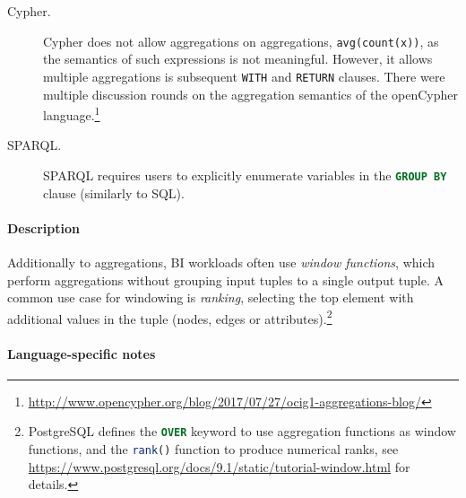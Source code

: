 \begin{description}
\item[Cypher.] Cypher does not allow aggregations on aggregations, \eg \lstinline[language=cypher]{avg(count(x))}, as the semantics of such expressions is not meaningful. However, it allows multiple aggregations is subsequent \lstinline[language=cypher]{WITH} and  \lstinline[language=cypher]{RETURN} clauses. There were multiple discussion rounds on the aggregation semantics of the openCypher language.\footnote{\url{http://www.opencypher.org/blog/2017/07/27/ocig1-aggregations-blog/}}

\item[SPARQL.] SPARQL requires users to explicitly enumerate variables in the \lstinline[language=sql]{GROUP BY} clause (similarly to SQL).
\end{description}





\paragraph{Description}

Additionally to aggregations, BI workloads often use \emph{window functions},
which perform aggregations without grouping input tuples to a single output
tuple.  A common use case for windowing is \emph{ranking}, \ie selecting the top
element with additional values in the tuple (nodes, edges or
attributes).\footnote{PostgreSQL defines the \lstinline[language=sql]{OVER}
keyword to use aggregation functions as window functions, and the
\lstinline[language=sql]{rank()} function to produce numerical ranks, see
\url{https://www.postgresql.org/docs/9.1/static/tutorial-window.html} for
details.}

\paragraph{Language-specific notes}

